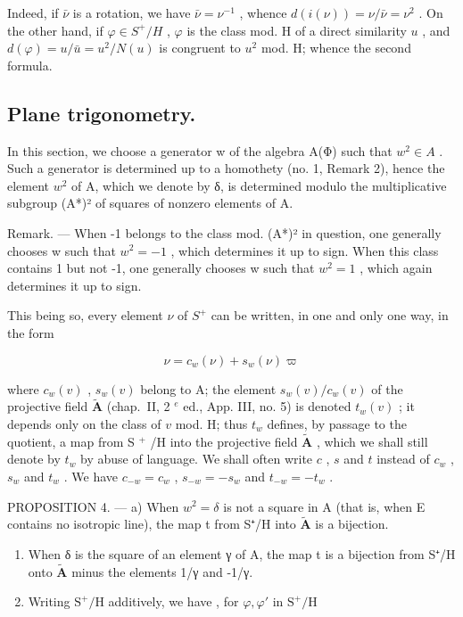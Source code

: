 Indeed, if \(\bar{\nu}\) is a rotation, we have \(\bar{\nu} = \nu^{-1}\) , whence \(d(i(\nu)) = \nu/\bar{\nu} = \nu^{2}\) . On the other hand, if \(\varphi \in S^{+}/H\) , \(\varphi\) is the class mod. H of a direct similarity \(u\) , and \(d(\varphi) = u/\bar{u} = u^{2}/N(u)\) is congruent to \(u^{2}\) mod. H; whence the second formula.

\subsection{Plane trigonometry.}

In this section, we choose a generator w of the algebra A(Φ) such that \(w^{2} \in A\) . Such a generator is determined up to a homothety (no. 1, Remark 2), hence the element \(w^{2}\) of A, which we denote by δ, is determined modulo the multiplicative subgroup (A*)² of squares of nonzero elements of A.

Remark. — When -1 belongs to the class mod. (A*)² in question, one generally chooses w such that \(w^{2} = -1\) , which determines it up to sign. When this class contains 1 but not -1, one generally chooses w such that \(w^{2} = 1\) , which again determines it up to sign.

This being so, every element \(\nu\) of \(S^{+}\) can be written, in one and only one way, in the form

\[
\nu = c _ {w} (\nu) + s _ {w} (\nu) \varpi\tag{1}
\]

where \(c_w(v)\) , \(s_w(v)\) belong to A; the element \(s_w(v)/c_w(v)\) of the projective field \(\tilde{\mathbf{A}}\) (chap.~II, 2 \(^{e}\) ed., App. III, no. 5) is denoted \(t_w(v)\) ; it depends only on the class of \(v\) mod. H; thus \(t_w\) defines, by passage to the quotient, a map from S \(^{+}\) /H into the projective field \(\tilde{\mathbf{A}}\) , which we shall still denote by \(t_w\) by abuse of language. We shall often write \(c\) , \(s\) and \(t\) instead of \(c_w\) , \(s_w\) and \(t_w\) . We have \(c_{-w} = c_w\) , \(s_{-w} = -s_w\) and \(t_{-w} = -t_w\) .

PROPOSITION 4. — a) When \(w^2 = \delta\) is not a square in A (that is, when E contains no isotropic line), the map t from S⁺/H into \(\tilde{\mathbf{A}}\) is a bijection.

\begin{enumerate}
\def\labelenumi{\alph{enumi})}
\setcounter{enumi}{1}
\item
  When δ is the square of an element γ of A, the map t is a bijection from S⁺/H onto \(\tilde{\mathbf{A}}\) minus the elements 1/γ and -1/γ.
\item
  Writing \(\mathrm{S}^{+}/\mathrm{H}\) additively, we have , for \(\varphi, \varphi'\) in \(\mathrm{S}^{+}/\mathrm{H}\)
\end{enumerate}

